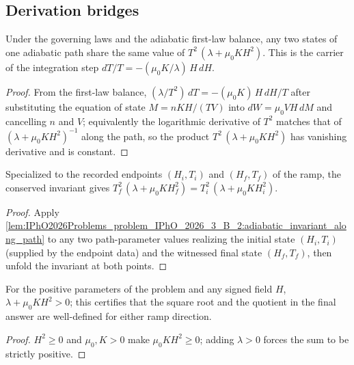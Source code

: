 \subsection*{Derivation bridges}

\begin{lemma}
\label{lem:IPhO2026Problems_problem_IPhO_2026_3_B_2:adiabatic_invariant_along_path}
Under the governing laws and the adiabatic first-law balance, any two states
of one adiabatic path share the same value of $T^2\,(\lambda + \mu_0 K H^2)$.
This is the carrier of the integration step
$dT/T = -(\mu_0 K/\lambda)\,H\,dH$.
\end{lemma}
\begin{proof}
From the first-law balance, $(\lambda/T^2)\,dT = -(\mu_0 K)\,H\,dH/T$ after
substituting the equation of state $M = nKH/(TV)$ into $dW = \mu_0 V H\,dM$
and cancelling $n$ and $V$; equivalently the logarithmic derivative of $T^2$
matches that of $(\lambda + \mu_0 K H^2)^{-1}$ along the path, so the product
$T^2\,(\lambda + \mu_0 K H^2)$ has vanishing derivative and is constant.
\end{proof}

\begin{lemma}
\label{lem:IPhO2026Problems_problem_IPhO_2026_3_B_2:endpoint_relation}
Specialized to the recorded endpoints $(H_i, T_i)$ and $(H_f, T_f)$ of the
ramp, the conserved invariant gives
$T_f^2\,(\lambda + \mu_0 K H_f^2) = T_i^2\,(\lambda + \mu_0 K H_i^2)$.
\end{lemma}
\begin{proof}
Apply
\cref{lem:IPhO2026Problems_problem_IPhO_2026_3_B_2:adiabatic_invariant_along_path}
to any two path-parameter values realizing the initial state $(H_i, T_i)$
(supplied by the endpoint data) and the witnessed final state $(H_f, T_f)$,
then unfold the invariant at both points.
\end{proof}

\begin{lemma}
\label{lem:IPhO2026Problems_problem_IPhO_2026_3_B_2:lam_add_mu0_K_sq_pos}
For the positive parameters of the problem and any signed field $H$,
$\lambda + \mu_0 K H^2 > 0$; this certifies that the square root and the
quotient in the final answer are well-defined for either ramp direction.
\end{lemma}
\begin{proof}
$H^2 \ge 0$ and $\mu_0, K > 0$ make $\mu_0 K H^2 \ge 0$; adding $\lambda > 0$
forces the sum to be strictly positive.
\end{proof}

